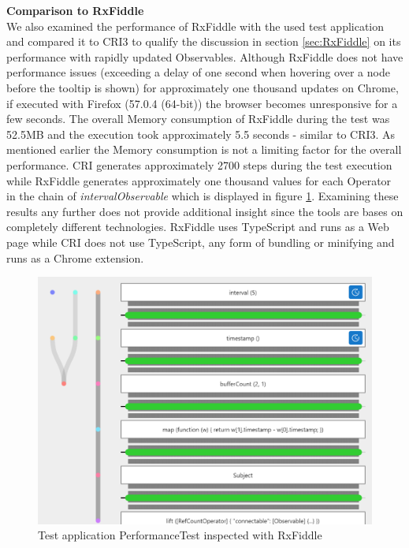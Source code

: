 	\textbf{Comparison to RxFiddle}\\
	We also examined the performance of RxFiddle with the used test application and compared it to CRI3 to qualify the discussion in section \ref{sec:RxFiddle} on its performance with rapidly updated Observables.
	Although RxFiddle does not have performance issues (exceeding a delay of one second when hovering over a node before the tooltip is shown) for approximately one thousand updates on Chrome, if executed with Firefox (57.0.4 (64-bit)) the browser becomes unresponsive for a few seconds. The overall Memory consumption of RxFiddle during the test was 52.5MB and the execution took approximately 5.5 seconds - similar to CRI3. As mentioned earlier the Memory consumption is not a limiting factor for the overall performance. CRI generates approximately 2700 steps during the test execution while RxFiddle generates approximately one thousand values for each Operator in the chain of \emph{intervalObservable} which is displayed in figure \ref{fig:RxFiddlePerformance}. Examining these results any further does not provide additional insight since the tools are bases on completely different technologies. RxFiddle uses TypeScript and runs as a Web page while CRI does not use TypeScript, any form of bundling or minifying and runs as a Chrome extension.
	
	\begin{figure}[!h]
		\centering
		\includegraphics[scale=0.7,trim=0 0 0 0]{gfx/RxFiddleWithTimer.png}
		\caption{Test application PerformanceTest inspected with RxFiddle}
		\label{fig:RxFiddlePerformance}
	\end{figure}
	
